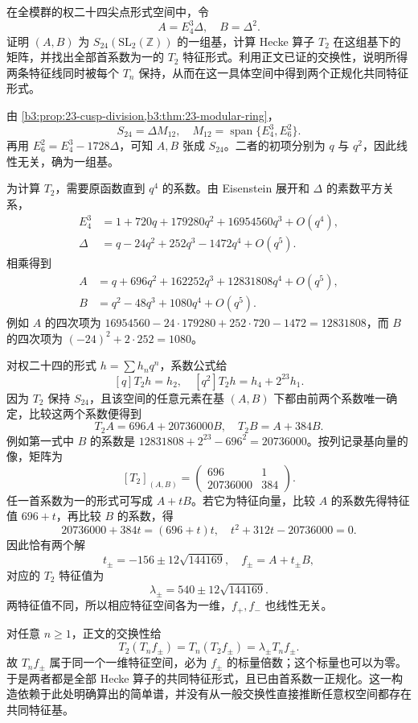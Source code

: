 \begin{exercise}\label{b3:ex:E-6}
在全模群的权二十四尖点形式空间中，令
\[
 A=E_4^3\Delta,\quad B=\Delta^2.
\]
证明 \((A,B)\) 为 \(S_{24}(\mathrm{SL}_2(\mathbb Z))\) 的一组基，计算 Hecke 算子 \(T_2\) 在这组基下的矩阵，并找出全部首系数为一的 \(T_2\) 特征形式。利用正文已证的交换性，说明所得两条特征线同时被每个 \(T_n\) 保持，从而在这一具体空间中得到两个正规化共同特征形式。
\end{exercise}
\begin{solution}
由 \cref{b3:prop:23-cusp-division,b3:thm:23-modular-ring}，
\[
 S_{24}=\Delta M_{12},
 \quad M_{12}=\operatorname{span}\{E_4^3,E_6^2\}.
\]
再用 \(E_6^2=E_4^3-1728\Delta\)，可知 \(A,B\) 张成 \(S_{24}\)。二者的初项分别为 \(q\) 与 \(q^2\)，因此线性无关，确为一组基。

为计算 \(T_2\)，需要原函数直到 \(q^4\) 的系数。由 Eisenstein 展开和 \(\Delta\) 的素数平方关系，
\[
 \begin{aligned}
 E_4^3&=1+720q+179280q^2+16954560q^3+O(q^4),\\
 \Delta&=q-24q^2+252q^3-1472q^4+O(q^5).
 \end{aligned}
\]
相乘得到
\[
 \begin{aligned}
 A&=q+696q^2+162252q^3+12831808q^4+O(q^5),\\
 B&=q^2-48q^3+1080q^4+O(q^5).
 \end{aligned}
\]
例如 \(A\) 的四次项为
\(16954560-24\cdot179280+252\cdot720-1472=12831808\)，而 \(B\) 的四次项为 \((-24)^2+2\cdot252=1080\)。

对权二十四的形式 \(h=\sum h_nq^n\)，系数公式给
\[
 [q]T_2h=h_2,
 \quad [q^2]T_2h=h_4+2^{23}h_1.
\]
因为 \(T_2\) 保持 \(S_{24}\)，且该空间的任意元素在基 \((A,B)\) 下都由前两个系数唯一确定，比较这两个系数便得到
\[
 T_2A=696A+20736000B,
 \quad T_2B=A+384B.
\]
例如第一式中 \(B\) 的系数是
\(12831808+2^{23}-696^2=20736000\)。按列记录基向量的像，矩阵为
\[
 [T_2]_{(A,B)}=
 \begin{pmatrix}
  696&1\\
  20736000&384
 \end{pmatrix}.
\]
任一首系数为一的形式可写成 \(A+tB\)。若它为特征向量，比较 \(A\) 的系数先得特征值 \(696+t\)，再比较 \(B\) 的系数，得
\[
 20736000+384t=(696+t)t,
 \quad t^2+312t-20736000=0.
\]
因此恰有两个解
\[
 t_\pm=-156\pm12\sqrt{144169},
 \quad f_\pm=A+t_\pm B,
\]
对应的 \(T_2\) 特征值为
\[
 \lambda_\pm=540\pm12\sqrt{144169}.
\]
两特征值不同，所以相应特征空间各为一维，\(f_+,f_-\) 也线性无关。

对任意 \(n\ge1\)，正文的交换性给
\[
 T_2(T_nf_\pm)=T_n(T_2f_\pm)=\lambda_\pm T_nf_\pm.
\]
故 \(T_nf_\pm\) 属于同一个一维特征空间，必为 \(f_\pm\) 的标量倍数；这个标量也可以为零。于是两者都是全部 Hecke 算子的共同特征形式，且已由首系数一正规化。这一构造依赖于此处明确算出的简单谱，并没有从一般交换性直接推断任意权空间都存在共同特征基。
\end{solution}

